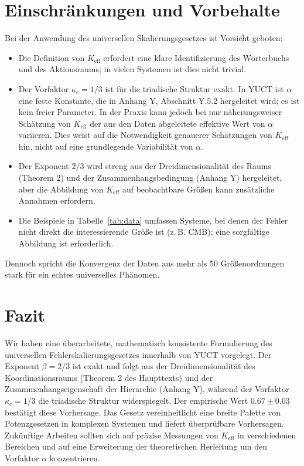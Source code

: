 \documentclass[12pt]{article}
\newcommand{\Keff}{K_{\mathrm{eff}}}
\newcommand{\kappac}{\kappa_c}
\begin{document}
	\section{Einschränkungen und Vorbehalte}
	\label{sec:limitations}
	
	Bei der Anwendung des universellen Skalierungsgesetzes ist Vorsicht geboten:
	\begin{itemize}
		\item Die Definition von \(\Keff\) erfordert eine klare Identifizierung des Wörterbuchs und des Aktionsraums; in vielen Systemen ist dies nicht trivial.
		\item Der Vorfaktor \(\kappac = 1/3\) ist für die triadische Struktur exakt. In YUCT ist \(\alpha\) eine feste Konstante, die in Anhang Y, Abschnitt Y.5.2 hergeleitet wird; es ist kein freier Parameter. In der Praxis kann jedoch bei nur näherungsweiser Schätzung von \(\Keff\) der aus den Daten abgeleitete effektive Wert von \(\alpha\) variieren. Dies weist auf die Notwendigkeit genauerer Schätzungen von \(\Keff\) hin, nicht auf eine grundlegende Variabilität von \(\alpha\).
		\item Der Exponent \(2/3\) wird streng aus der Dreidimensionalität des Raums (Theorem 2) und der Zusammenhangsbedingung (Anhang Y) hergeleitet, aber die Abbildung von \(\Keff\) auf beobachtbare Größen kann zusätzliche Annahmen erfordern.
		\item Die Beispiele in Tabelle~\ref{tab:data} umfassen Systeme, bei denen der Fehler nicht direkt die interessierende Größe ist (z. B. CMB); eine sorgfältige Abbildung ist erforderlich.
	\end{itemize}
	
	Dennoch spricht die Konvergenz der Daten aus mehr als 50 Größenordnungen stark für ein echtes universelles Phänomen.
	
	\section{Fazit}
	Wir haben eine überarbeitete, mathematisch konsistente Formulierung des universellen Fehlerskalierungsgesetzes innerhalb von YUCT vorgelegt. Der Exponent \(\beta = 2/3\) ist exakt und folgt aus der Dreidimensionalität des Koordinationsraums (Theorem 2 des Haupttexts) und der Zusammenhangseigenschaft der Hierarchie (Anhang Y), während der Vorfaktor \(\kappac = 1/3\) die triadische Struktur widerspiegelt. Der empirische Wert \(0.67 \pm 0.03\) bestätigt diese Vorhersage. Das Gesetz vereinheitlicht eine breite Palette von Potenzgesetzen in komplexen Systemen und liefert überprüfbare Vorhersagen. Zukünftige Arbeiten sollten sich auf präzise Messungen von \(\Keff\) in verschiedenen Bereichen und auf eine Erweiterung der theoretischen Herleitung um den Vorfaktor \(\alpha\) konzentrieren.
	
\end{document}

